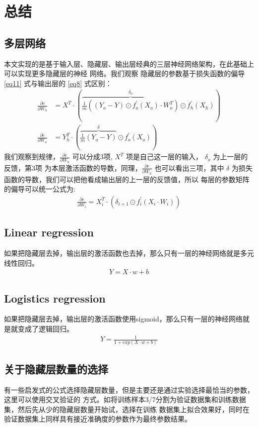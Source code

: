 \documentclass[12pt, a4paper, oneside]{ctexart}
\begin{document}
\newpage
\section{总结}

\subsection{多层网络}
本文实现的是基于输入层、隐藏层、输出层经典的三层神经网络架构，在此基础上可以实现更多隐藏层的神经
网络。我们观察 隐藏层的参数基于损失函数的偏导 \eqref{eq11} 式与输出层的 \eqref{eq8} 式区别：
\begin{align}
    \frac{\partial e}{\partial W_h} &= X^T \cdot (\overbrace{\frac{1}{m}((Y_o - Y) \odot f_o^{'}(X_o) \cdot W_o^T)}^{\delta_o} \odot f_h^{'}(X_h)) \nonumber\\
    \frac{\partial e}{\partial W_o} &= Y_h^T \cdot (\overbrace{\frac{1}{m}(Y_o - Y)}^{\delta} \odot f_o^{'}(X_o)) \nonumber
\end{align}
我们观察到规律，$ \frac{\partial e}{\partial W_h}$ 可以分成3项, $X^T$ 项是自己这一层的输入，
$\delta_o$ 为上一层的反馈，第3项 为本层激活函数的导数，同理，$ \frac{\partial e}{\partial W_h}$ 
也可以看出三项，其中 $\delta$ 为损失函数的导数，我们可以把他看成输出层的上一层的反馈值，所以
每层的参数矩阵的偏导可以统一公式为:
\begin{align}
    \frac{\partial e}{\partial W_{i}} = X_i^T \cdot (\delta_{i+1} \odot f_i^{'}(X_i \cdot W_i))  \nonumber
\end{align}

\subsection{Linear regression}
如果把隐藏层去掉，输出层的激活函数也去掉，那么只有一层的神经网络就是多元线性回归。
\begin{align}
    Y = X \cdot w + b \nonumber
\end{align}
\subsection{Logistics regression}
如果把隐藏层去掉，输出层的激活函数使用sigmoid，那么只有一层的神经网络就是就变成了逻辑回归。
\begin{align}
    Y = \frac{1}{1+exp(X \cdot w + b)} \nonumber
\end{align}
\subsection{关于隐藏层数量的选择}
有一些启发式的公式选择隐藏层数量，但是主要还是通过实验选择最恰当的参数，这里可以使用交叉验证的
方式。如将训练样本3/7分割为验证数据集和训练数据集，然后先从少的隐藏层数量开始试，选择在训练
数据集上拟合效果好，同时在验证数据集上同样具有接近准确度的参数作为最终参数结果。
\end{document}
